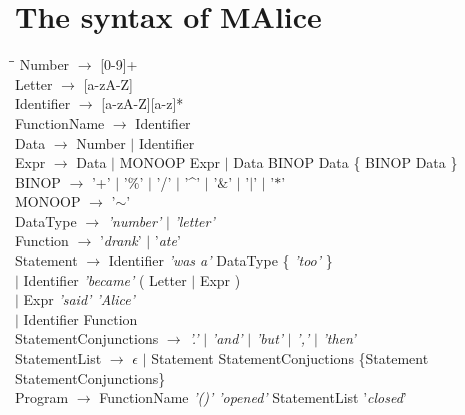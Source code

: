 \documentclass[a4wide, 11pt]{article}
\begin{document}
\section{The syntax of MAlice}
\label{sec:bnf}
	\begin{tabbing}
	\hspace*{8mm}\=\hspace*{25mm}\=\kill
		\> Number $\rightarrow$ [0-9]+ \\
		\> Letter $\rightarrow$ [a-zA-Z] \\
		\> Identifier $\rightarrow$ [a-zA-Z][a-z]* \\

	 	\> FunctionName $\rightarrow$ Identifier \\
		\> Data $\rightarrow$ Number $\mid$ Identifier \\
		\> Expr	$\rightarrow$ Data $\mid$ MONOOP Expr 
					$\mid$ Data BINOP Data \{ BINOP Data \}\\
		\> BINOP $\rightarrow$ '+' $\mid$ '$\%$' $\mid$ '/' $\mid$ '\^{ }' 
							$\mid$ '$\&$' $\mid$ '$\mid$' $\mid$ '$\ast$' \\
		\> MONOOP $\rightarrow$ '$\mathtt{\sim}$'\\

		\> DataType $\rightarrow$ \emph{'number'} $\mid$ \emph{'letter'} \\
		\> Function $\rightarrow$ '\emph{drank}' $\mid$ '\emph{ate}' \\

		
		\> Statement $\rightarrow$ Identifier \emph{'was a'} DataType \{ \emph{'too'} \}\\
		\> \> $\mid$ Identifier \emph{'became'} ( Letter $\mid$ Expr ) \\
		\> \>	$\mid$ Expr \emph{'said' 'Alice'} \\
		\> \> $\mid$ Identifier Function \\

				
		\> StatementConjunctions $\rightarrow$ \emph{'.'} $\mid$ \emph{'and'} $\mid$ \emph{'but'} $\mid$ \emph{','} $\mid$ \emph{'then'} \\
		\> StatementList $\rightarrow$ $\epsilon$ $\mid$ Statement StatementConjuctions \{Statement StatementConjunctions\} \\

		\> Program $\rightarrow$ FunctionName  \emph{'()' 'opened' } StatementList '\emph{closed}'
	\end{tabbing}

\begin{verbatim}
\end{verbatim}
\end{document}
